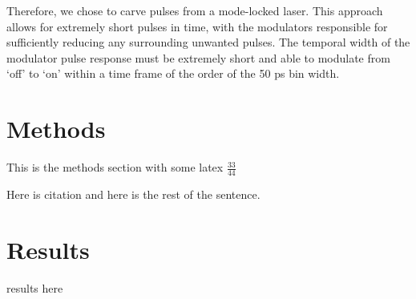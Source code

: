 \documentclass{optica-article}
\begin{document}
Therefore, we chose to carve pulses from a mode-locked laser. This approach allows for extremely short pulses in time, with the modulators responsible for sufficiently reducing any surrounding unwanted pulses. The temporal width of the modulator pulse response must be extremely short and able to modulate from `off' to `on' within a time frame of the order of the 50 ps bin width.

\hypertarget{methods}{%
\section{Methods}\label{methods}}

This is the methods section with some latex \(\frac{33}{44}\)

Here is citation \cite{Dolinar2011Photon} and here is the rest of the sentence.

\hypertarget{results}{%
\section{Results}\label{results}}

results here


\end{document}
